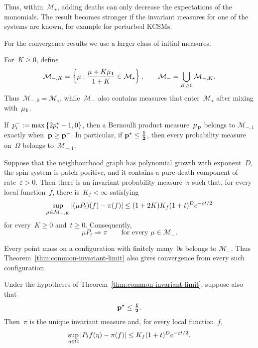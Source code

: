 \documentclass[EJP,preprint,NODS,nobera]{ejpecp}
\begin{document}
Thus, within~$\mathcal M_\star$, adding deaths can only decrease the expectations of the monomials. The result becomes stronger if the invariant measures for one of the systems are known, for example for perturbed KCSMs.

For the convergence results we use a larger class of initial measures.

\begin{definition}
For~$K\geq0$, define
\begin{equation}
\label{eq:m-minus-affine-characterization}
\mathcal M_{-,K}
=
\left\{
\mu:
\frac{\mu+K\mu_{\mathbf{1}}}{1+K}\in\mathcal M_\star
\right\},
\qquad
\mathcal M_-
=
\bigcup_{K\geq0}\mathcal M_{-,K}.
\end{equation}
Thus~$\mathcal M_{-,0}=\mathcal M_\star$, while~$\mathcal M_-$ also contains
measures that enter~$\mathcal M_\star$ after mixing with~$\mu_{\mathbf{1}}$.
\end{definition}

If~$p_i^-:=\max\left\{2p_i^\star-1,0\right\}$, then a Bernoulli product measure~$\mu_{\mathbf{p}}$ belongs to
$\mathcal M_{-,1}$ exactly when~$\mathbf{p}\geq\mathbf{p}^-$. In particular, if
$\mathbf{p}^\star\leq\boldsymbol{\tfrac12}$, then every probability measure on~$\Omega$ belongs to~$\mathcal M_{-,1}$.

\begin{theorem}
\label{thm:common-invariant-limit}
Suppose that the neighbourhood graph has polynomial growth with exponent~$D$,
the spin system is patch-positive, and it contains a pure-death component of
rate~$\varepsilon>0$. Then there is an invariant probability measure~$\pi$
such that, for every local function~$f$, there is~$K_f<\infty$ satisfying
\begin{equation}
\label{eq:uniform-m-minus-convergence}
\sup_{\mu\in\mathcal M_{-,K}}
\left|(\mu P_t)(f)-\pi(f)\right|
\leq
(1+2K)K_f(1+t)^D e^{-\varepsilon t/2}
\end{equation}
for every~$K\geq0$ and~$t\geq0$. Consequently,
\begin{equation*}
\mu P_t\Rightarrow\pi
\qquad
\text{for every }\mu\in\mathcal M_-.
\end{equation*}
\end{theorem}

Every point mass on a configuration with finitely many~$0$s belongs to
$\mathcal M_-$. Thus Theorem~\ref{thm:common-invariant-limit} also gives
convergence from every such configuration.

\begin{corollary}
\label{cor:uniform-exponential-ergodicity}
Under the hypotheses of Theorem~\ref{thm:common-invariant-limit}, suppose also
that
\begin{equation*}
\mathbf{p}^\star\leq\boldsymbol{\tfrac12}.
\end{equation*}
Then~$\pi$ is the unique invariant measure and, for every local function~$f$,
\begin{equation}
\label{eq:uniform-pointwise-convergence}
\sup_{\eta\in\Omega}
\left|P_tf(\eta)-\pi(f)\right|
\leq
K_f(1+t)^D e^{-\varepsilon t/2}.
\end{equation}
\end{corollary}
\end{document}
